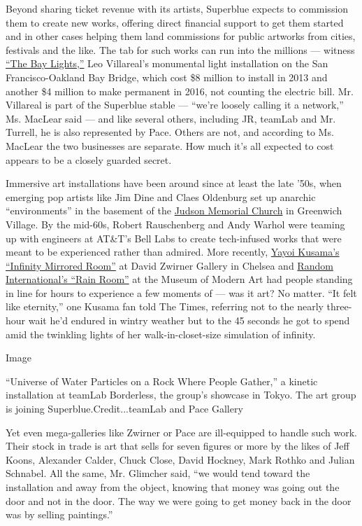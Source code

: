 Beyond sharing ticket revenue with its artists, Superblue expects to
commission them to create new works, offering direct financial support
to get them started and in other cases helping them land commissions for
public artworks from cities, festivals and the like. The tab for such
works can run into the millions --- witness
\href{https://illuminate.org/projects/the-bay-lights/}{``The Bay
Lights,''} Leo Villareal's monumental light installation on the San
Francisco-Oakland Bay Bridge, which cost \$8 million to install in 2013
and another \$4 million to make permanent in 2016, not counting the
electric bill. Mr. Villareal is part of the Superblue stable --- ``we're
loosely calling it a network,'' Ms. MacLear said --- and like several
others, including JR, teamLab and Mr. Turrell, he is also represented by
Pace. Others are not, and according to Ms. MacLear the two businesses
are separate. How much it's all expected to cost appears to be a closely
guarded secret.

Immersive art installations have been around since at least the late
'50s, when emerging pop artists like Jim Dine and Claes Oldenburg set up
anarchic ``environments'' in the basement of the
\href{https://www.judson.org/arts}{Judson Memorial Church} in Greenwich
Village. By the mid-60s, Robert Rauschenberg and Andy Warhol were
teaming up with engineers at AT\&T's Bell Labs to create tech-infused
works that were meant to be experienced rather than admired. More
recently,
\href{https://www.nytimes.com/2013/12/02/arts/design/yayoi-kusamas-mirrored-room-at-david-zwirner-gallery.html}{Yayoi
Kusama's ``Infinity Mirrored Room''} at David Zwirner Gallery in Chelsea
and
\href{https://www.nytimes.com/video/arts/design/100000002254021/rain-room-at-the-barbican-center.html}{Random
International's ``Rain Room''} at the Museum of Modern Art had people
standing in line for hours to experience a few moments of --- was it
art? No matter. ``It felt like eternity,'' one Kusama fan told The
Times, referring not to the nearly three-hour wait he'd endured in
wintry weather but to the 45 seconds he got to spend amid the twinkling
lights of her walk-in-closet-size simulation of infinity.

Image

``Universe of Water Particles on a Rock Where People Gather,'' a kinetic
installation at teamLab Borderless, the group's showcase in Tokyo. The
art group is joining Superblue.Credit...teamLab and Pace Gallery

Yet even mega-galleries like Zwirner or Pace are ill-equipped to handle
such work. Their stock in trade is art that sells for seven figures or
more by the likes of Jeff Koons, Alexander Calder, Chuck Close, David
Hockney, Mark Rothko and Julian Schnabel. All the same, Mr. Glimcher
said, ``we would tend toward the installation and away from the object,
knowing that money was going out the door and not in the door. The way
we were going to get money back in the door was by selling paintings.''

